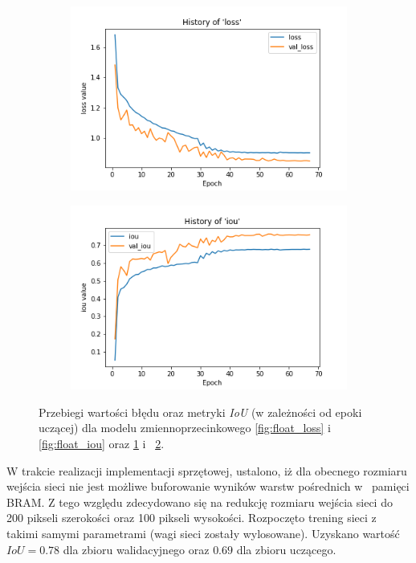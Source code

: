 \begin{figure}
\begin{subfigure}[b]{0.49\textwidth}
         \includegraphics[width=\textwidth]{images/8_bit_quant_hist_of_loss.png}
         \caption{}
         \label{fig:quant_loss}
     \end{subfigure}
     \hfill
     \begin{subfigure}[b]{0.49\textwidth}
         \centering
         \includegraphics[width=\textwidth]{images/8_bit_quant_hist_of_iou.png}
         \caption{}
         \label{fig:quant_iou}
     \end{subfigure}
     \hfill
     
    \caption{Przebiegi wartości błędu oraz metryki \emph{IoU} (w zależności od epoki uczącej) dla modelu zmiennoprzecinkowego \ref{fig:float_loss} i~ \ref{fig:float_iou} oraz \ref{fig:quant_loss} i~ \ref{fig:quant_iou}.}
    \label{fig:two_step_train}
\end{figure}


W trakcie realizacji implementacji sprzętowej, ustalono, iż dla obecnego rozmiaru wejścia sieci nie jest możliwe buforowanie wyników warstw pośrednich w~ pamięci BRAM.
Z tego względu zdecydowano się na redukcję rozmiaru wejścia sieci do 200 pikseli szerokości oraz 100 pikseli wysokości. 
Rozpoczęto trening sieci z~ takimi samymi parametrami (wagi sieci zostały wylosowane).  
Uzyskano wartość $IoU = 0.78$ dla zbioru walidacyjnego oraz $0.69$ dla zbioru uczącego.


